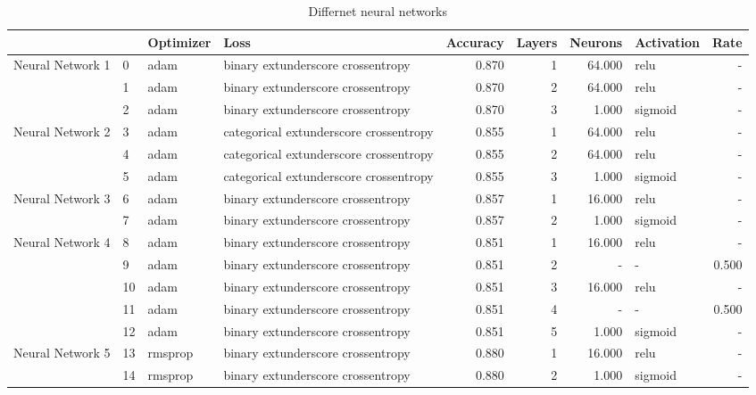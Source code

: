 \begin{table}[h!]
\caption{Differnet neural networks}
\label{tab:RawData}
\begin{tabular}{llllrrrlr}
\toprule
 &  & Optimizer & Loss & Accuracy & Layers & Neurons & Activation & Rate \\
\midrule
\multirow[t]{3}{*}{Neural Network 1} & 0 & adam & binary	extunderscore crossentropy & 0.870 & 1 & 64.000 & relu & - \\
 & 1 & adam & binary	extunderscore crossentropy & 0.870 & 2 & 64.000 & relu & - \\
 & 2 & adam & binary	extunderscore crossentropy & 0.870 & 3 & 1.000 & sigmoid & - \\
\cline{1-9}
\multirow[t]{3}{*}{Neural Network 2} & 3 & adam & categorical	extunderscore crossentropy & 0.855 & 1 & 64.000 & relu & - \\
 & 4 & adam & categorical	extunderscore crossentropy & 0.855 & 2 & 64.000 & relu & - \\
 & 5 & adam & categorical	extunderscore crossentropy & 0.855 & 3 & 1.000 & sigmoid & - \\
\cline{1-9}
\multirow[t]{2}{*}{Neural Network 3} & 6 & adam & binary	extunderscore crossentropy & 0.857 & 1 & 16.000 & relu & - \\
 & 7 & adam & binary	extunderscore crossentropy & 0.857 & 2 & 1.000 & sigmoid & - \\
\cline{1-9}
\multirow[t]{5}{*}{Neural Network 4} & 8 & adam & binary	extunderscore crossentropy & 0.851 & 1 & 16.000 & relu & - \\
 & 9 & adam & binary	extunderscore crossentropy & 0.851 & 2 & - & - & 0.500 \\
 & 10 & adam & binary	extunderscore crossentropy & 0.851 & 3 & 16.000 & relu & - \\
 & 11 & adam & binary	extunderscore crossentropy & 0.851 & 4 & - & - & 0.500 \\
 & 12 & adam & binary	extunderscore crossentropy & 0.851 & 5 & 1.000 & sigmoid & - \\
\cline{1-9}
\multirow[t]{2}{*}{Neural Network 5} & 13 & rmsprop & binary	extunderscore crossentropy & 0.880 & 1 & 16.000 & relu & - \\
 & 14 & rmsprop & binary	extunderscore crossentropy & 0.880 & 2 & 1.000 & sigmoid & - \\
\cline{1-9}
\bottomrule
\end{tabular}
\end{table}
